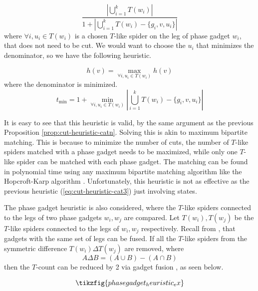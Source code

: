 \begin{equation}
    \frac{\left|\bigcup_{i=1}^k T(w_i)\right|}
    {1+\left|\bigcup_{i=1}^k T(w_i) - \{g_i, v, u_i\}\right|}
\end{equation}
where $\forall i, u_i \in T(w_i)$ is a chosen $T$-like spider on the leg of phase gadget $w_i$,
that does not need to be cut.
We would want to choose the $u_i$ that minimizes the denominator, so we have the following heuristic.

\begin{equation}
    \label{eq:cut-heuristic-catn-max}
    h(v) = \max_{\forall i, u_i\in T(w_i)} h(v)
\end{equation}
where the denominator is minimized.
\begin{equation}
    t_{\min} = 1+\min_{\forall i, u_i\in T(w_i)} \left|\bigcup_{i=1}^k T(w_i) - \{g_i, v, u_i\}\right|
\end{equation}

It is easy to see that this heuristic is valid, 
by the same argument as the previous Proposition \ref{prop:cut-heuristic-catn}.
Solving this is akin to maximum bipartite matching.
This is because to minimize the number of cuts, the number of $T$-like spiders matched with a phase gadget
needs to be maximized, while only one $T$-like spider can be matched with each phase gadget.
The matching can be found in polynomial time using any maximum bipartite matching algorithm 
like the Hopcroft-Karp algorithm \cite{Hopcroft1973}.
Unfortunately, this heuristic is not as effective as the previous heuristic (\ref{eq:cut-heuristic-cat3})
just involving  states.

The phase gadget heuristic is also considered, where the $T$-like spiders connected to the legs 
of two phase gadgets $w_i,w_j$ are compared.
Let $T(w_i),T(w_j)$ be the $T$-like spiders connected to the legs of $w_i,w_j$ respectively.
Recall from \GFRule, that gadgets with the same set of legs can be fused.
If all the $T$-like spiders from the symmetric difference $T(w_i) \Delta T(w_j) $ are removed, where
\begin{equation}
    A \Delta B = (A \cup B) - (A \cap B)
\end{equation}
then the $T$-count can be reduced by 2 via gadget fusion \GFRule, as seen below.

\begin{equation}
    \label{eq:phasegadget_heuristic_ex}
    \tikzfig{phasegadget_heuristic_ex}
\end{equation}

